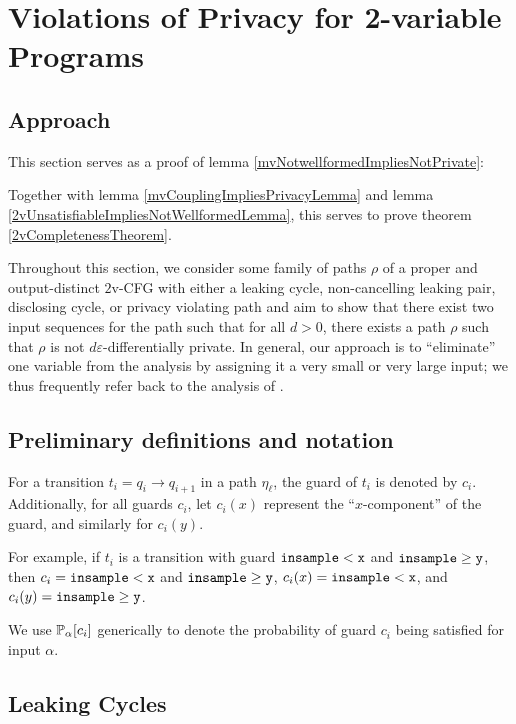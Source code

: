 \section{Violations of Privacy for 2-variable Programs}

\subsection{Approach}

This section serves as a proof of lemma \ref{mvNotwellformedImpliesNotPrivate}: 


Together with lemma \ref{mvCouplingImpliesPrivacyLemma} and lemma \ref{2vUnsatisfiableImpliesNotWellformedLemma}, this serves to prove theorem \ref{2vCompletenessTheorem}.


Throughout this section, we consider some family of paths $\rho$ of a proper and output-distinct $2$v-CFG with either a leaking cycle, non-cancelling leaking pair, disclosing cycle, or privacy violating path and aim to show that there exist two input sequences for the path such that for all $d>0$, there exists a path $\rho$ such that $\rho$ is not $d\varepsilon$-differentially private. 
In general, our approach is to ``eliminate'' one variable from the analysis by assigning it a very small or very large input; we thus frequently refer back to the analysis of \cite{chadhaLinearTimeDecidability2021}. 



\subsection{Preliminary definitions and notation}

\begin{defn}
	For a transition $t_i = q_i\to q_{i+1}$ in a path $\eta_\ell$, the guard of $t_i$ is denoted by $c_i$. Additionally, for all guards $c_i$, let $c_i(x)$ represent the ``$x$-component'' of the guard, and similarly for $c_i(y)$.
	
	For example, if $t_i$ is a transition with guard $\lguard[\texttt{x}]$ and $\gguard[\texttt{y}]$, then $c_i = \lguard[\texttt{x}]$ and $\gguard[\texttt{y}]$, $c_i(x)=\lguard[\texttt{x}]$, and $c_i(y)=\gguard[\texttt{y}]$.
	\end{defn}
	
We use $\PP_\alpha[c_i]$ generically to denote the probability of guard $c_i$ being satisfied for input $\alpha$.

\subsection{Leaking Cycles}

